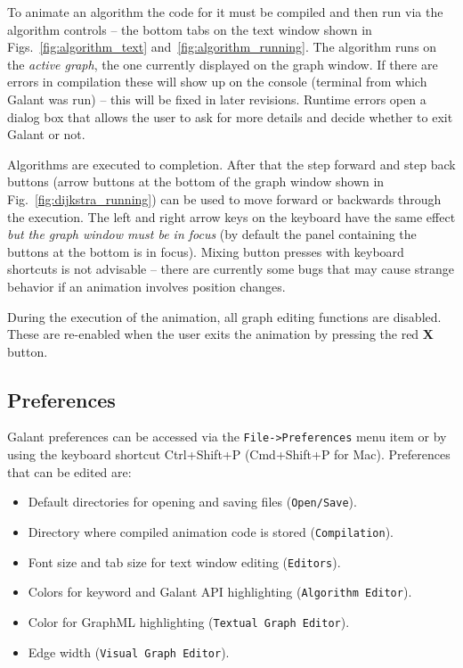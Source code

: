 To animate an algorithm the code for it must be compiled and then run via the
algorithm controls
 -- the bottom tabs on the text window shown in Figs.~\ref{fig:algorithm_text}
and~\ref{fig:algorithm_running}.
The algorithm runs on the \emph{active graph}, the one currently displayed
on the graph window.
If there are errors in compilation these will show up on the console (terminal
from which Galant was run) -- this will be fixed in later revisions.
Runtime errors open a dialog box that allows the user to ask for more details
and decide whether to exit Galant or not.

Algorithms are executed to completion. After that the step forward and step
back buttons (arrow buttons at the bottom of the graph window shown in Fig.~\ref{fig:dijkstra_running}) can be used to move forward or backwards through the execution.
The left and right arrow keys on the keyboard have the same effect
\emph{but the graph window must be in focus} (by default the panel
containing the buttons at the
bottom is in focus).
Mixing button presses with keyboard shortcuts is not advisable --
there are currently some bugs that may cause strange behavior if an animation
involves position changes.

During the execution of the animation, all graph editing functions are disabled.
These are re-enabled when the user exits the animation by pressing the red \textbf{X} button.

\subsection{Preferences}
\label{sec:preferences}

Galant preferences can be accessed via the \texttt{File->Preferences}
menu item or by using the keyboard shortcut Ctrl+Shift+P (Cmd+Shift+P for Mac).
Preferences that can be edited are:
\begin{itemize}
\item
Default directories for opening and saving files (\texttt{Open/Save}).
\item
Directory where compiled animation code is stored (\texttt{Compilation}).
\item
Font size and tab size for text window editing (\texttt{Editors}).
\item
Colors for keyword and Galant API highlighting (\texttt{Algorithm~Editor}).
\item
Color for GraphML highlighting (\texttt{Textual~Graph~Editor}).
\item
Edge width (\texttt{Visual~Graph~Editor}).
\end{itemize}


